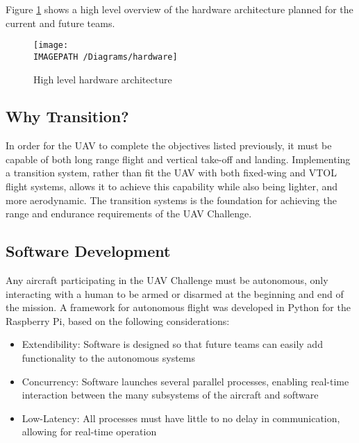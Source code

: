 Figure \ref{fig:hardwarearch-exec} shows a high level overview of the hardware architecture planned for the current and future teams.

\begin{figure}[!h]
	\centering
	\texttt{[image: \\IMAGEPATH /Diagrams/hardware]}
	\caption{High level hardware architecture}
	\label{fig:hardwarearch-exec}
\end{figure}

\subsection{Why Transition?}
In order for the UAV to complete the objectives listed previously, it must be capable of both long range flight and vertical take-off and landing. Implementing a transition system, rather than fit the UAV with both fixed-wing and VTOL flight systems, allows it to achieve this capability while also being lighter, and more aerodynamic. The transition systems is the foundation for achieving the range and endurance requirements of the UAV Challenge.

\subsection{Software Development}
Any aircraft participating in the UAV Challenge must be autonomous, only interacting with a human to be armed or disarmed at the beginning and end of the mission. A framework for autonomous flight was developed in Python for the Raspberry Pi, based on the following considerations:
\begin{itemize}
	\item Extendibility: Software is designed so that future teams can easily add functionality to the autonomous systems
	\item Concurrency: Software launches several parallel processes, enabling real-time interaction between the many subsystems of the aircraft and software
	\item Low-Latency: All processes must have little to no delay in communication, allowing for real-time operation 
\end{itemize}

